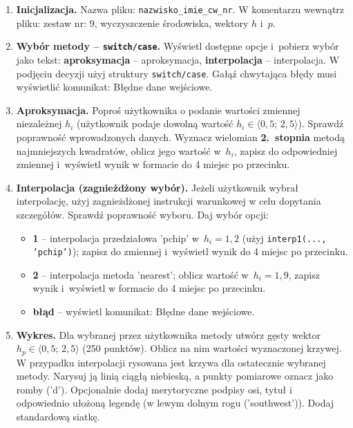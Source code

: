 \documentclass[a4paper,11pt]{article}
\begin{document}
\begin{enumerate}[leftmargin=*, label=\textbf{\arabic*.}, itemsep=2pt]

  \item \textbf{Inicjalizacja.}
    Nazwa pliku: \texttt{nazwisko\_imie\_cw\_nr}. W komentarzu wewnątrz pliku: zestaw nr: 9, wyczyszczenie środowiska, wektory $h$ i~$p$.

  \item \textbf{Wybór metody -- \texttt{switch/case}.}
    Wyświetl dostępne opcje i~pobierz wybór jako tekst: \textbf{aproksymacja} -- aproksymacja, \textbf{interpolacja} -- interpolacja. W podjęciu decyzji użyj struktury \texttt{switch/case}. Gałąź chwytająca błędy musi wyświetlić komunikat: Błędne dane wejściowe.

  \item \textbf{Aproksymacja.}
    Poproś użytkownika o podanie wartości zmiennej niezależnej $h_i$ (użytkownik podaje dowolną wartość $h_i \in \langle 0{,}5;\,2{,}5 \rangle$). Sprawdź poprawność wprowadzonych danych. Wyznacz wielomian \textbf{2.~stopnia} metodą najmniejszych kwadratów, oblicz jego wartość w~$h_i$, zapisz do odpowiedniej zmiennej i~wyświetl wynik w formacie do 4 miejsc po przecinku.

  \item \textbf{Interpolacja (zagnieżdżony wybór).}
    Jeżeli użytkownik wybrał interpolację, użyj zagnieżdżonej instrukcji warunkowej w celu dopytania szczegółów. Sprawdź poprawność wyboru. Daj wybór opcji:
    \begin{itemize}[itemsep=1pt]
      \item \textbf{1} -- interpolacja przedziałowa 'pchip' w~$h_i = 1{,}2$ (użyj \texttt{interp1(..., 'pchip')}); zapisz do zmiennej i~wyświetl wynik do 4 miejsc po przecinku.
      \item \textbf{2} -- interpolacja metoda 'nearest'; oblicz wartość w~$h_i = 1{,}9$, zapisz wynik i~wyświetl w formacie do 4 miejsc po przecinku.
      \item \textbf{błąd} -- wyświetl komunikat: Błędne dane wejściowe.
    \end{itemize}

  \item \textbf{Wykres.}
    Dla wybranej przez użytkownika metody utwórz gęsty wektor $h_p \in \langle 0{,}5;\,2{,}5 \rangle$ (250 punktów). Oblicz na nim wartości wyznaczonej krzywej. W przypadku interpolacji rysowana jest krzywa dla ostatecznie wybranej metody. Narysuj ją linią ciągłą niebieską, a punkty pomiarowe oznacz jako romby ('d'). Opcjonalnie dodaj merytoryczne podpisy osi, tytuł i odpowiednio ułożoną legendę (w lewym dolnym rogu ('southwest')). Dodaj standardową siatkę.

\end{enumerate}
\end{document}
